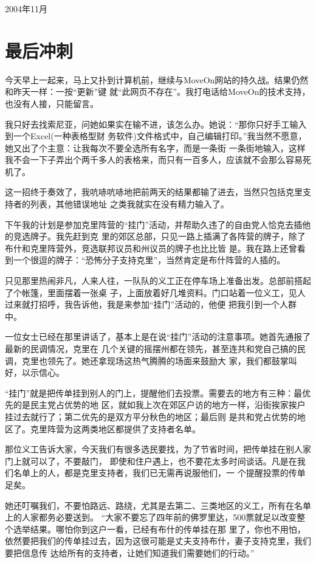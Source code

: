 ﻿\documentclass[11pt]{article}
\begin{document}
2004年11月

\section{最后冲刺}

今天早上一起来，马上又扑到计算机前，继续与MoveOn网站的持久战。结果仍然和昨天一样：一按``更新''键
就``此网页不存在''。我打电话给MoveOn的技术支持，也没有人接，只能留言。

我只好去找索尼亚，问她如果实在输不进，该怎么办。她说：``那你只好手工输入到一个Excel(一种表格型财
务软件)文件格式中，自己编辑打印。''我当然不愿意，她又出了个主意：让我每次不要全选所有名字，而是一条街
一条街地输入，这样我不会一下子弄出个两千多人的表格来，而只有一百多人，应该就不会那么容易死机了。

这一招终于奏效了，我吭哧吭哧地把前两天的结果都输了进去，当然只包括克里支持者的列表，其他错误地址
之类我就实在没有精力输入了。

下午我的计划是参加克里阵营的``挂门''活动，并帮助久违了的自由党人恰克去插他的竞选牌子。我先赶到克
里的郊区总部，只见一路上插满了各阵营的牌子，除了布什和克里阵营外，竞选联邦议员和州议员的牌子也比比皆
是。我在路上还曾看到一个很逗的牌子：``恐怖分子支持克里''，当然肯定是布什阵营的人插的。

只见那里热闹非凡，人来人往，一队队的义工正在停车场上准备出发。总部前搭起了个帐篷，里面摆着一张桌
子，上面放着好几堆资料。门口站着一位义工，见人过来就打招呼，我告诉他，我是来参加``挂门''活动的，他便
把我引到一个人群中。

一位女士已经在那里讲话了，基本上是在说``挂门''活动的注意事项。她首先通报了最新的民调情况，克里在
几个关键的摇摆州都在领先，甚至连共和党自己搞的民调，克里也领先了。她还拿现场这热气腾腾的场面来鼓励大
家，我们都鼓掌叫好，以示信心。

``挂门''就是把传单挂到别人的门上，提醒他们去投票。需要去的地方有三种：最优先的是民主党占优势的地
区，就如我上次在郊区户访的地方一样，沿街挨家挨户挂过去就行了；第二优先的是双方平分秋色的地区；最后则
是共和党占优势的地区了。克里阵营为这两类地区都提供了支持者名单。

那位义工告诉大家，今天我们有很多选民要找，为了节省时间，把传单挂在别人家门上就可以了，不要敲门，
即使和住户遇上，也不要花太多时间谈话。凡是在我们名单上的人，都是克里支持者，我们已无需再说服他们，一
个提醒投票的传单足矣。

她还叮嘱我们，不要怕路远、路绕，尤其是去第二、三类地区的义工，所有在名单上的人家都务必要送到。
``大家不要忘了四年前的佛罗里达，500票就足以改变整个选举结果。哪怕你到这户一看，已经有布什的传单挂在那
里了，你也不用怕，依然要把我们的传单挂过去，因为这很可能是丈夫支持布什，妻子支持克里，我们要把信息传
达给所有的支持者，让她们知道我们需要她们的行动。''
\end{document}
